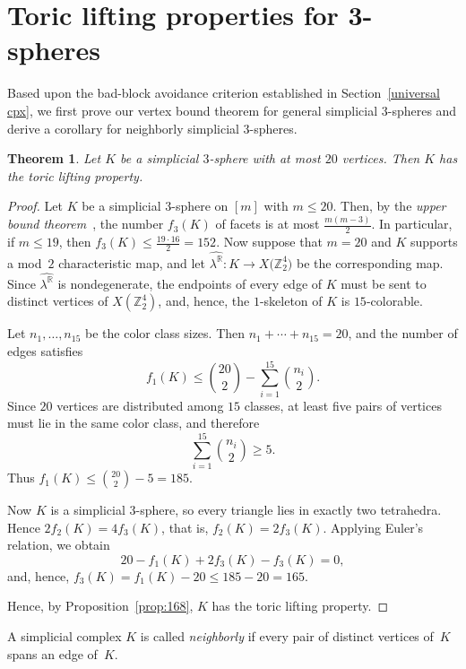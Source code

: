 \documentclass{amsart}
\newcommand{\Z}{\mathbb{Z}}
\newcommand{\R}{\mathbb{R}}
\newtheorem{theorem}{Theorem}[section]
\theoremstyle{definition}
\theoremstyle{remark}
\begin{document}
\section{Toric lifting properties for 3-spheres} \label{toric lifting property}

Based upon the bad-block avoidance criterion established in Section~\ref{universal cpx}, we first prove our  vertex bound theorem for general simplicial 3-spheres and derive a corollary for neighborly  simplicial 3-spheres.
\begin{theorem}\label{thm:main}
    Let $K$ be a simplicial $3$-sphere with at most $20$ vertices.
    Then $K$ has the toric lifting property.
\end{theorem}
\begin{proof}
    Let $K$ be a simplicial $3$-sphere on $[m]$ with $m \leq 20$.
    Then, by the \emph{upper bound theorem}~\cite{Stanley1975}, the number $f_3(K)$ of facets is at most $\frac{m(m-3)}{2}$.
    In particular, if $m \leq 19$, then $f_3(K) \leq \frac{19 \cdot 16}{2} = 152$.
    Now suppose that $m=20$ and $K$ supports a mod~$2$ characteristic map, and let $\widehat{\lambda^\R} \colon K\to X\bigl(\Z_2^4\bigr)$ be the corresponding map.
    Since $\widehat{\lambda^\R}$ is nondegenerate, the endpoints of every edge of $K$ must be sent to distinct vertices of $X(\Z_2^4)$, and, hence, the $1$-skeleton of $K$ is $15$-colorable.
    
    Let $n_1,\dots,n_{15}$ be the color class sizes. 
    Then $n_1+\cdots+n_{15}=20$, and the number of edges satisfies
    $$
        f_1(K) \leq \binom{20}{2}-\sum_{i=1}^{15}\binom{n_i}{2}.
    $$
    Since $20$ vertices are distributed among $15$ classes, at least five pairs of vertices must lie in the same color class, and therefore
    $$
        \sum_{i=1}^{15}\binom{n_i}{2}\ge 5.
    $$
    Thus $f_1(K)\le \binom{20}{2}-5=185$.
    
    Now $K$ is a simplicial $3$-sphere, so every triangle lies in exactly two tetrahedra. 
    Hence $2f_2(K)=4f_3(K)$, that is, $f_2(K)=2f_3(K)$.
    Applying Euler's relation, we obtain
    $$
        20-f_1(K)+2f_3(K)-f_3(K)=0,
    $$
    and, hence, $f_3(K)=f_1(K)-20\le 185-20=165$.
    
    Hence, by Proposition~\ref{prop:168}, $K$ has the toric lifting property.
\end{proof}

A simplicial complex $K$ is called \emph{neighborly} if every pair of distinct vertices of~$K$ spans an edge of~$K$.
\end{document}
